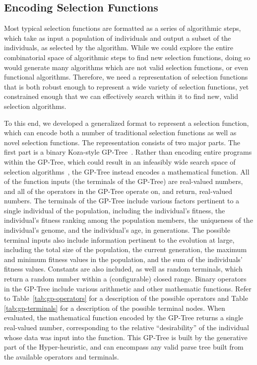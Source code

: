 \documentclass[sigconf]{acmart}
\begin{document}
\subsection{Encoding Selection Functions}
\label{Methodology-Encoding Selection Functions}

Most typical selection functions are formatted as a series of algorithmic steps, which take as input a population of individuals and output a subset of the individuals, as selected by the algorithm. While we could explore the entire combinatorial space of algorithmic steps to find new selection functions, doing so would generate many algorithms which are not valid selection functions, or even functional algorithms. Therefore, we need a representation of selection functions that is both robust enough to represent a wide variety of selection functions, yet constrained enough that we can effectively search within it to find new, valid selection algorithms.

To this end, we developed a generalized format to represent a selection function, which can encode both a number of traditional selection functions as well as novel selection functions. The representation consists of two major parts. The first part is a binary Koza-style GP-Tree~\citep{koza1994genetic}. Rather than encoding entire programs within the GP-Tree, which could result in an infeasibly wide search space of selection algorithms~\citep{woodward2009GPNotGood}, the GP-Tree instead encodes a mathematical function. All of the function inputs (the terminals of the GP-Tree) are real-valued numbers, and all of the operators in the GP-Tree operate on, and return, real-valued numbers. The terminals of the GP-Tree include various factors pertinent to a single individual of the population, including the individual's fitness, the individual's fitness ranking among the population members, the uniqueness of the individual's genome, and the individual's age, in generations. The possible terminal inputs also include information pertinent to the evolution at large, including the total size of the population, the current generation, the maximum and minimum fitness values in the population, and the sum of the individuals' fitness values. Constants are also included, as well as random terminals, which return a random number within a (configurable) closed range. Binary operators in the GP-Tree include various arithmetic and other mathematic functions. Refer to Table~\ref{tab:gp-operators} for a description of the possible operators and Table \ref{tab:gp-terminals} for a description of the possible terminal nodes. When evaluated, the mathematical function encoded by the GP-Tree returns a single real-valued number, corresponding to the relative ``desirability'' of the individual whose data was input into the function. This GP-Tree is built by the generative part of the Hyper-heuristic, and can encompass any valid parse tree built from the available operators and terminals.
\end{document}
